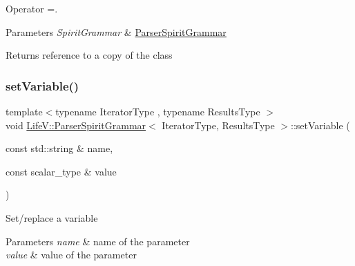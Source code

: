 Operator =. 


\begin{DoxyParams}{Parameters}
{\em Spirit\+Grammar} & \hyperlink{classLifeV_1_1ParserSpiritGrammar}{Parser\+Spirit\+Grammar} \\
\hline
\end{DoxyParams}
\begin{DoxyReturn}{Returns}
reference to a copy of the class 
\end{DoxyReturn}
\mbox{\label{classLifeV_1_1ParserSpiritGrammar_add7ee83b39ebf408710c820a4365eafa}} 
\subsubsection{\texorpdfstring{set\+Variable()}{setVariable()}}
{\footnotesize\ttfamily template$<$typename Iterator\+Type , typename Results\+Type $>$ \\
void \hyperlink{classLifeV_1_1ParserSpiritGrammar}{Life\+V\+::\+Parser\+Spirit\+Grammar}$<$ Iterator\+Type, Results\+Type $>$\+::set\+Variable (\begin{DoxyParamCaption}\item[{const std\+::string \&}]{name,  }\item[{const scalar\+\_\+type \&}]{value }\end{DoxyParamCaption})\hspace{0.3cm}{\ttfamily [inline]}}

Set/replace a variable


\begin{DoxyParams}{Parameters}
{\em name} & name of the parameter \\
\hline
{\em value} & value of the parameter \\
\hline
\end{DoxyParams}
\mbox{\label{classLifeV_1_1ParserSpiritGrammar_a53ba937b8359b093d650d1a907d7b738}} 
